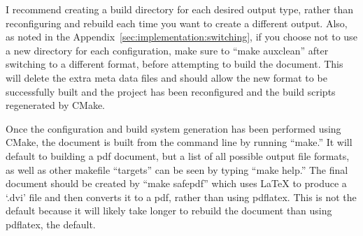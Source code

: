 I recommend creating a build directory for each desired output type,
rather than reconfiguring and rebuild each time you want to create a
different output. Also, as noted in the
Appendix~\ref{sec:implementation:switching}, if you choose not to use
a new directory for each configuration, make sure to ``make auxclean''
after switching to a different format, before attempting to build the
document. This will delete the extra meta data files and should
allow the new format to be successfully built and the project has been
reconfigured and the build scripts regenerated by CMake.

Once the configuration and build system generation has been performed
using CMake, the document is built from the command line by running
``make.'' It will default to building a pdf document, but a list of
all possible output file formats, as well as other makefile
``targets'' can be seen by typing ``make help.'' The
final document should be created by ``make safepdf'' which uses \LaTeX{} to
produce a `.dvi' file and then converts it to a pdf, rather than using
pdflatex. This is not the default because it will likely take longer
to rebuild the document than using pdflatex, the default.

